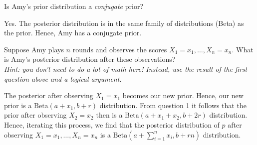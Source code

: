 \begin{exercise}[1]
Is Amy's prior distribution a \textit{conjugate} prior?
\begin{solution}
Yes. The posterior distribution is in the same family of distributions (Beta) as the prior. Hence, Amy has a conjugate prior.
\end{solution}
\end{exercise}

\begin{exercise}[1.5]
Suppose Amy plays $n$ rounds and observes the scores $X_1 = x_1, \ldots, X_n = x_n$. What is Amy's posterior distribution after these observations? \\
\textit{Hint: you don't need to do a lot of math here! Instead, use the result of the first question above and a logical argument.}
\begin{solution}
The posterior after observing $X_1 = x_1$ becomes our new prior. Hence, our new prior is a $\text{Beta}(a+x_1,b+r)$ distribution. From question 1 it follows that the prior after observing $X_2 = x_2$ then is a $\text{Beta}(a+x_1 + x_2,b+ 2r)$ distribution. Hence, iterating this process, we find that the posterior distribution of $p$ after observing $X_1 = x_1, \ldots, X_n = x_n$ is a $\text{Beta}(a+\sum_{i=1}^n x_i,b+ rn)$ distribution.
\end{solution}
\end{exercise}
